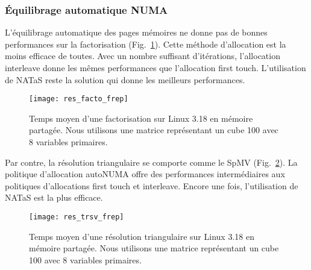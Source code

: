 \subsubsection{\'Equilibrage automatique NUMA}

L'équilibrage automatique des pages mémoires ne donne pas de bonnes performances sur la factorisation (Fig.~\ref{fig:res_facto_frep}).
%
Cette méthode d'allocation est la moins efficace de toutes.
%
Avec un nombre suffisant d'itérations, l'allocation interleave donne les mêmes performances que l'allocation first touch.
%
L'utilisation de NATaS reste la solution qui donne les meilleurs performances.


\begin{figure}[t!]
  \centering
  \texttt{[image: res\_facto\_frep]}
  \caption{Temps moyen d'une factorisation sur Linux 3.18 en mémoire partagée. Nous utilisons une matrice représentant un cube 100 avec 8 variables primaires.}
  \label{fig:res_facto_frep}
\end{figure}

Par contre, la résolution triangulaire se comporte comme le SpMV (Fig.~\ref{fig:res_trsv_frep}).
%
La politique d'allocation autoNUMA offre des performances intermédiaires aux politiques d'allocations first touch et interleave.
%
Encore une fois, l'utilisation de NATaS est la plus efficace.


\begin{figure}[t!]
  \centering
  \texttt{[image: res\_trsv\_frep]}
  \caption{Temps moyen d'une résolution triangulaire sur Linux 3.18 en mémoire partagée. Nous utilisons une matrice représentant un cube 100 avec 8 variables primaires.}
  \label{fig:res_trsv_frep}
\end{figure}

